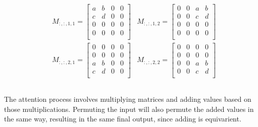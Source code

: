 \documentclass{article}
\begin{document}
\subsection{}
\begin{align*}
    &M_{:,:,1, 1} = 
    \begin{bmatrix}
        a & b & 0 & 0\\
        c & d & 0 & 0\\
        0 & 0 & 0 & 0\\
        0 & 0 & 0 & 0\\
    \end{bmatrix}
    &M_{:,:,1, 2} = 
    \begin{bmatrix}
        0 & 0 & a & b\\
        0 & 0 & c & d\\
        0 & 0 & 0 & 0\\
        0 & 0 & 0 & 0\\
    \end{bmatrix} \\
    &M_{:,:,2, 1} = 
    \begin{bmatrix}
        0 & 0 & 0 & 0\\
        0 & 0 & 0 & 0\\
        a & b & 0 & 0\\
        c & d & 0 & 0\\
    \end{bmatrix} 
    &M_{:,:,2, 2} = 
    \begin{bmatrix}
        0 & 0 & 0 & 0\\
        0 & 0 & 0 & 0\\
        0 & 0 & a & b\\
        0 & 0 & c & d\\
    \end{bmatrix}
\end{align*}



\subsection{}
The attention process involves multiplying matrices and adding values 
based on those multiplications.
Permuting the input will also permute the added values in the same way, 
resulting in the same final output, since adding is equivarient.
\end{document}
